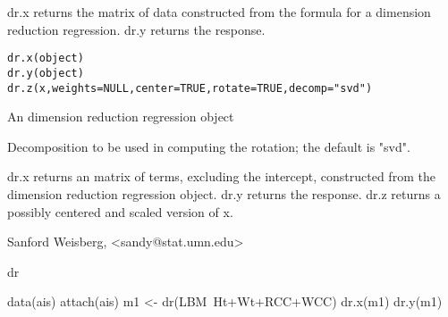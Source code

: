 \begin{Description}\relax
dr.x returns the matrix of data constructed from the formula for a
dimension reduction regression.  dr.y returns the response.\end{Description}
\begin{Usage}
\begin{verbatim}
dr.x(object)
dr.y(object)
dr.z(x,weights=NULL,center=TRUE,rotate=TRUE,decomp="svd")
\end{verbatim}
\end{Usage}
\begin{Arguments}
\begin{ldescription}
\item[\code{object}] An dimension reduction regression object
\item[\code{x}] 
\item[\code{weights}] 
\item[\code{center}] 
\item[\code{rotate}] 
\item[\code{decomp}] 
\end{ldescription}
 Decomposition to be used in computing the rotation; the
default is "svd".\end{Arguments}
\begin{Value}
dr.x returns an  matrix of terms, excluding the 
intercept, constructed from the dimension reduction regression object.  dr.y returns the
response. dr.z returns a possibly centered and scaled version of x.\end{Value}
\begin{Author}\relax
Sanford Weisberg, <sandy@stat.umn.edu>\end{Author}
\begin{SeeAlso}\relax
dr\end{SeeAlso}
\begin{Examples}
\begin{ExampleCode}
data(ais)
attach(ais)
m1 <- dr(LBM~Ht+Wt+RCC+WCC)
dr.x(m1)
dr.y(m1)
\end{ExampleCode}
\end{Examples}

